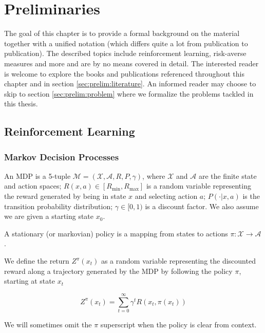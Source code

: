 \chapter{Preliminaries}\label{ch:prelim}

The goal of this chapter is to provide a formal background on the material together with a unified notation (which differs quite a lot from publication to publication). The described topics include reinforcement learning, risk-averse measures and more and are by no means covered in detail. The interested reader is welcome to explore the books and publications referenced throughout this chapter and in section \ref{sec:prelim:literature}. An informed reader may choose to skip to section \ref{sec:prelim:problem} where we formalize the problems tackled in this thesis.

\section{Reinforcement Learning}\label{sec:prelim:rl}


\subsection{Markov Decision Processes}
An MDP is a 5-tuple $\mathcal{M} = (\mathcal{X}, \mathcal{A}, R, P, \gamma)$, where $\mathcal{X}$ and $\mathcal{A}$ are the finite state and action spaces; $R(x, a) \in [R_{\min}, R_{\max}]$ is a random variable representing the reward generated by being in state $x$ and selecting action $a$; $P(\cdot|x, a)$ is the transition probability distribution; $\gamma \in [0, 1)$ is a discount factor. We also assume we are given a starting state $x_0$.


A stationary (or markovian) policy is a mapping from states to actions $\pi:\mathcal{X} \to \mathcal{A}$.

We define the return $Z^\pi(x_t)$ as a random variable representing the discounted reward along a trajectory generated by the MDP by following the policy $\pi$, starting at state $x_t$

\begin{equation}
Z^\pi(x_{t})=\sum_{t=0}^\infty \gamma^tR(x_t,\pi(x_t))
\end{equation}

We will sometimes omit the $\pi$ superscript when the policy is clear from context.

